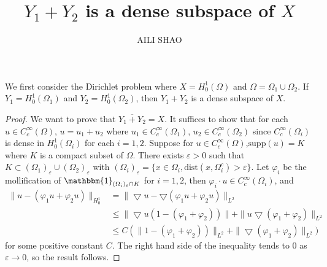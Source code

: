 \documentclass[11pt, a4paper]{amsart}
\begin{document}
\title{$Y_1+Y_2$ is a dense subspace of $X$}
\author{AILI SHAO}
\maketitle
\hrulefill
\hrulefill
\hrulefill

We first consider the Dirichlet problem where $X=H_{0}^1(\Omega)$ and $\Omega=\Omega_1\cup\Omega_2$. If $Y_1=H_{0}^{1}(\Omega_1)$ and $Y_2=H_{0}^{1}(\Omega_2)$, then $Y_1+Y_2$ is a dense subspace of $X$.

\begin{proof}
We want to prove that $\overline{Y_1+Y_2}=X$.
It suffices to show that for each $u\in C_{c}^{\infty}(\Omega)$, $u=u_1+u_2$ where $u_1\in C_{c}^{\infty}(\Omega_1)$, $u_2\in C_{c}^{\infty}(\Omega_2)$ since $C_{c}^{\infty}(\Omega_i)$ is dense in $H_{0}^{1}(\Omega_i)$ for each $i=1,2$. Suppose for $u\in C_{c}^{\infty}(\Omega)$,$\mathrm{supp} (u)=K$ where $K$ is a compact subset of $\Omega$. There exists $\varepsilon>0$ such that $K\subset (\Omega_1)_{\varepsilon}\cup (\Omega_2)_{\varepsilon}$ with $(\Omega_i)_{\varepsilon}=\{x\in \Omega_i, \mathrm{dist}(x, \Omega_{i}^{c})>\varepsilon\}$. Let $\varphi_i$ be the mollification of $\mathbbm{1}_{(\Omega_i)_{\varepsilon}\cap K}$ for $i=1,2$, then $\varphi_i \cdot u\in C_{c}^{\infty}(\Omega_i)$, and 
\begin{align*}
\|u-(\varphi_1 u+ \varphi_2 u)\|_{H_{0}^1}&=\| \bigtriangledown u -\bigtriangledown (\varphi_1 u+\varphi_2 u)\|_{L^2}\\
{}&\leq \| \bigtriangledown u(1-(\varphi_1+\varphi_2))\|+\|u\bigtriangledown (\varphi_1+\varphi_2)\|_{L^2}\\
{}& \leq C(\|1-(\varphi_1+\varphi_2))\|_{L^2}+\|\bigtriangledown (\varphi_1+\varphi_2)\|_{L^2})
\end{align*}
 for some positive constant $C$. The right hand side of the inequality tends to $0$ as $\varepsilon\to 0$, so the result follows.
\end{proof}
\end{document}
